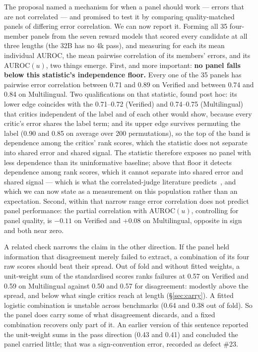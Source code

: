 \documentclass[11pt]{article}
\begin{document}
The proposal named a mechanism for when a panel should work --- errors that are not correlated --- and promised to test it by comparing quality-matched panels of differing error correlation. We can now report it. Forming all 35 four-member panels from the seven reward models that scored every candidate at all three lengths (the 32B has no 4k pass), and measuring for each its mean individual AUROC, the mean pairwise correlation of its members' errors, and its $\mathrm{AUROC}(u)$, two things emerge. First, and more important: \textbf{no panel falls below this statistic's independence floor.} Every one of the 35 panels has pairwise error correlation between 0.71 and 0.89 on Verified and between 0.74 and 0.84 on Multilingual. Two qualifications on that statistic, found post hoc: its lower edge coincides with the 0.71--0.72 (Verified) and 0.74--0.75 (Multilingual) that critics independent of the label and of each other would show, because every critic's error shares the label term; and its upper edge survives permuting the label (0.90 and 0.85 on average over 200 permutations), so the top of the band is dependence among the critics' rank scores, which the statistic does not separate into shared error and shared signal. The statistic therefore exposes no panel with less dependence than its uninformative baseline; above that floor it detects dependence among rank scores, which it cannot separate into shared error and shared signal --- which is what the correlated-judge literature predicts~\citep{goel2025great,kim2025correlated,kohli2026nine}, and which we can now state as a measurement on this population rather than an expectation. Second, within that narrow range error correlation does not predict panel performance: the partial correlation with $\mathrm{AUROC}(u)$, controlling for panel quality, is $-0.11$ on Verified and $+0.08$ on Multilingual, opposite in sign and both near zero.

A related check narrows the claim in the other direction. If the panel held information that disagreement merely failed to extract, a combination of its four raw scores should beat their spread. Out of fold and without fitted weights, a unit-weight sum of the standardised scores ranks failures at 0.57 on Verified and 0.59 on Multilingual against 0.50 and 0.57 for disagreement: modestly above the spread, and below what single critics reach at length (\S\ref{sec:carry}). A fitted logistic combination is unstable across benchmarks (0.64 and 0.38 out of fold). So the panel does carry some of what disagreement discards, and a fixed combination recovers only part of it. An earlier version of this sentence reported the unit-weight sums in the pass direction (0.43 and 0.41) and concluded the panel carried little; that was a sign-convention error, recorded as defect \#23.
\end{document}
